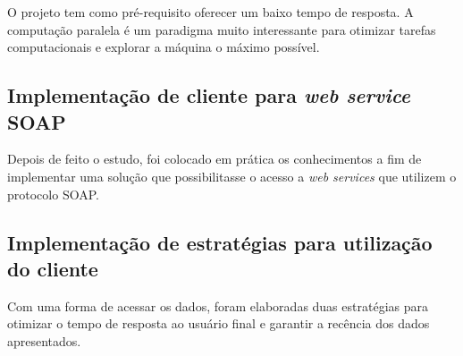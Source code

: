 O projeto tem como pré-requisito oferecer um baixo tempo de resposta. A computação paralela é um paradigma muito interessante para otimizar tarefas computacionais e explorar a máquina o máximo possível.

\subsection{Implementação de cliente para \textit{web service} SOAP}

Depois de feito o estudo, foi colocado em prática os conhecimentos a fim de implementar uma solução que possibilitasse o acesso a \textit{web services} que utilizem o protocolo SOAP.

\subsection{Implementação de estratégias para utilização do cliente}

Com uma forma de acessar os dados, foram elaboradas duas estratégias para otimizar o tempo de resposta ao usuário final e garantir a recência dos dados apresentados.

